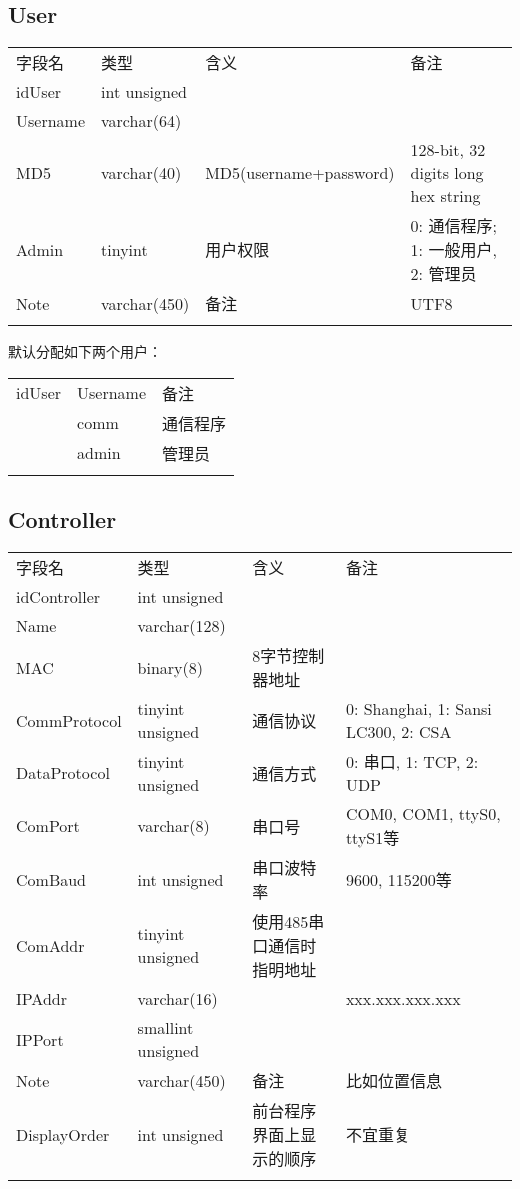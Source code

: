 \subsection{User}\label{user}

\begin{longtabu}[c]{@{}lXXX@{}}
\toprule\addlinespace
字段名 & 类型 & 含义 & 备注
\\\addlinespace
\midrule\endhead
idUser & int unsigned & &
\\\addlinespace
Username & varchar(64) & &
\\\addlinespace
MD5 & varchar(40) & MD5(username+password) & 128-bit, 32 digits long hex
string
\\\addlinespace
Admin & tinyint & 用户权限 & 0: 通信程序; 1: 一般用户, 2: 管理员
\\\addlinespace
Note & varchar(450) & 备注 & UTF8
\\\addlinespace
\bottomrule
\end{longtabu}

默认分配如下两个用户：

\begin{longtabu}[c]{@{}lll@{}}
\toprule\addlinespace
idUser & Username & 备注
\\\addlinespace
\midrule{} & comm & 通信程序
\\ & admin & 管理员
\\\addlinespace
\bottomrule
\end{longtabu}

\subsection{Controller}\label{controller}

\begin{longtabu}[c]{@{}lXXX@{}}
\toprule\addlinespace
字段名 & 类型 & 含义 & 备注
\\\addlinespace
\midrule\endhead
idController & int unsigned & &
\\\addlinespace
Name & varchar(128) & &
\\\addlinespace
MAC & binary(8) & 8字节控制器地址 &
\\\addlinespace
CommProtocol & tinyint unsigned & 通信协议 & 0: Shanghai, 1: Sansi
LC300, 2: CSA
\\\addlinespace
DataProtocol & tinyint unsigned & 通信方式 & 0: 串口, 1: TCP, 2: UDP
\\\addlinespace
ComPort & varchar(8) & 串口号 & COM0, COM1, ttyS0, ttyS1等
\\\addlinespace
ComBaud & int unsigned & 串口波特率 & 9600, 115200等
\\\addlinespace
ComAddr & tinyint unsigned & 使用485串口通信时指明地址 &
\\\addlinespace
IPAddr & varchar(16) & & xxx.xxx.xxx.xxx
\\\addlinespace
IPPort & smallint unsigned & &
\\\addlinespace
Note & varchar(450) & 备注 & 比如位置信息
\\\addlinespace
DisplayOrder & int unsigned & 前台程序界面上显示的顺序 & 不宜重复
\\\addlinespace
\bottomrule
\end{longtabu}

